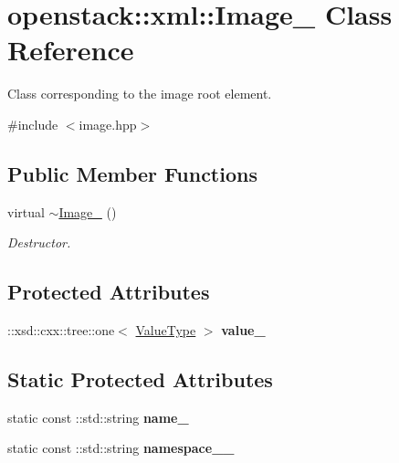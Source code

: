 \hypertarget{classopenstack_1_1xml_1_1Image__}{
\section{openstack::xml::Image\_\- Class Reference}
\label{classopenstack_1_1xml_1_1Image__}
}


Class corresponding to the image root element.  




{\ttfamily \#include $<$image.hpp$>$}

\subsection*{Public Member Functions}
\begin{DoxyCompactItemize}
\item 
\hypertarget{classopenstack_1_1xml_1_1Image___aeabb571cda9153b91ae9d7a420390ce3}{
virtual \hyperlink{classopenstack_1_1xml_1_1Image___aeabb571cda9153b91ae9d7a420390ce3}{$\sim$Image\_\-} ()}
\label{classopenstack_1_1xml_1_1Image___aeabb571cda9153b91ae9d7a420390ce3}

\begin{DoxyCompactList}\small\item\em Destructor. \item\end{DoxyCompactList}\end{DoxyCompactItemize}
\subsection*{Protected Attributes}
\begin{DoxyCompactItemize}
\item 
\hypertarget{classopenstack_1_1xml_1_1Image___a5d4cb0d416882ec6da58a1a4ed3cf04e}{
::xsd::cxx::tree::one$<$ \hyperlink{classopenstack_1_1xml_1_1Image}{ValueType} $>$ {\bfseries value\_\-}}
\label{classopenstack_1_1xml_1_1Image___a5d4cb0d416882ec6da58a1a4ed3cf04e}

\end{DoxyCompactItemize}
\subsection*{Static Protected Attributes}
\begin{DoxyCompactItemize}
\item 
\hypertarget{classopenstack_1_1xml_1_1Image___a658801a2a50cca7d26a880a5d79d110d}{
static const ::std::string {\bfseries name\_\-}}
\label{classopenstack_1_1xml_1_1Image___a658801a2a50cca7d26a880a5d79d110d}

\item 
\hypertarget{classopenstack_1_1xml_1_1Image___ae06b7807f02ef67c96211f03b797da49}{
static const ::std::string {\bfseries namespace\_\-\_\-}}
\label{classopenstack_1_1xml_1_1Image___ae06b7807f02ef67c96211f03b797da49}

\end{DoxyCompactItemize}
